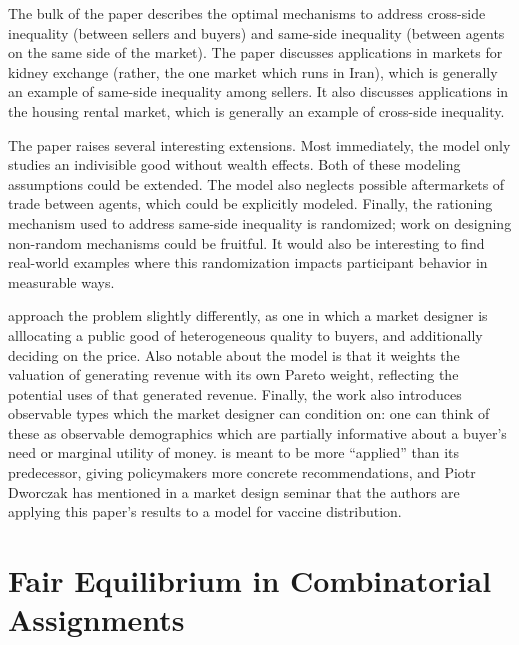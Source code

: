 \documentclass[JEL]{AEA}
\begin{document}
The bulk of the paper describes the optimal mechanisms to address cross-side inequality (between sellers and buyers) and same-side inequality (between agents on the same side of the market). The paper discusses applications in markets for kidney exchange (rather, the one market which runs in Iran), which is generally an example of same-side inequality among sellers. It also discusses applications in the housing rental market, which is generally an example of cross-side inequality.


The paper raises several interesting extensions. Most immediately, the model only studies an indivisible good without wealth effects. Both of these modeling assumptions could be extended. The model also neglects possible aftermarkets of trade between agents, which could be explicitly modeled. Finally, the rationing mechanism used to address same-side inequality is randomized; work on designing non-random mechanisms could be fruitful. It would also be interesting to find real-world examples where this randomization impacts participant behavior in measurable ways.



\cite{akbarpour-2020} approach the problem slightly differently, as one in which a market designer is alllocating a public good of heterogeneous quality to buyers, and additionally deciding on the price. Also notable about the \cite{akbarpour-2020} model is that it weights the valuation of generating revenue with its own Pareto weight, reflecting the potential uses of that generated revenue. Finally, the work also introduces observable types which the market designer can condition on: one can think of these as observable demographics which are partially informative about a buyer's need or marginal utility of money. \cite{akbarpour-2020} is meant to be more ``applied'' than its predecessor, giving policymakers more concrete recommendations, and Piotr Dworczak has mentioned in a market design seminar that the authors are applying this paper's results to a model for vaccine distribution.


\section{Fair Equilibrium in Combinatorial Assignments}
\end{document}
